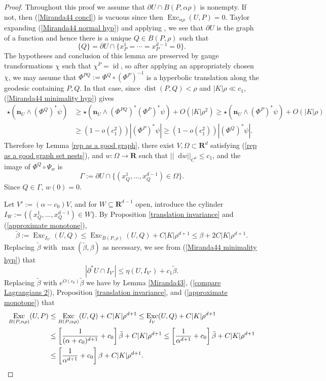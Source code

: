\documentclass[reqno,10pt]{amsart}
\newcommand{\RR}{\mathbf{R}}
\DeclareMathOperator{\Exc}{Exc}
\DeclareMathOperator{\id}{id}
\newcommand*\dif{\mathop{}\!\mathrm{d}}
\DeclareMathOperator{\dist}{dist}
\newcommand{\normal}{\mathbf n}
\theoremstyle{definition}
\numberwithin{equation}{section}
\begin{document}
\begin{proof}
Throughout this proof we assume that $\partial U \cap B(P, \alpha \rho)$ is nonempty.
If not, then (\ref{Miranda44 concl}) is vacuous since then $\Exc_{\alpha \rho} (U, P) = 0$.
Taylor expanding (\ref{Miranda44 normal hyp}) and applying \cite[Theorem 4.8]{Giusti77}, we see that $\partial U$ is the graph of a function and hence there is a unique $Q \in B(P, \rho)$ such that 
$$\{Q\} = \partial U \cap \{x_P^1 = \cdots = x_P^{d - 1} = 0\}.$$
The hypotheses and conclusion of this lemma are preserved by gauge transformations $\chi$ such that $\chi^P = \id$, so after applying an appropriately chosen $\chi$, we may assume that $\Phi^{PQ} := \Phi^Q \circ (\Phi^P)^{-1}$ is a hyperbolic translation along the geodesic containing $P, Q$. In that case, since $\dist(P, Q) < \rho$ and $|K| \rho \ll c_1$, (\ref{Miranda44 minimality hyp}) gives
\begin{align*}
\star(\normal_U \wedge (\Phi^Q)^* \psi) &\geq \star(\normal_U \wedge (\Phi^{PQ})^* (\Phi^P)^* \psi) + O(|K| \rho^2) \geq \star (\normal_U \wedge (\Phi^P)^* \psi) + O(|K| \rho) \\
&\geq (1 - o(c_1^2)) |(\Phi^P)^* \psi| \geq (1 - o(c_1^2)) |(\Phi^Q)^* \psi|.
\end{align*}
Therefore by Lemma \ref{rep as a good graph}, there exist $V, \Omega \subset \RR^d$ satisfying (\ref{rep as a good graph set nests}), and $w: \Omega \to \RR$ such that $||\dif w||_{C^0} \leq c_1$, and the image of $\Phi^Q \circ \Psi_w$ is
$$\Gamma := \partial U \cap \{(x_Q^1, \dots, x_Q^{d - 1}) \in \Omega\}.$$
Since $Q \in \Gamma$, $w(0) = 0$.

Let $V' := (\alpha - c_0) V$, and for $W \subseteq \RR^{d - 1}$ open, introduce the cylinder $I_W := \{(x^1_Q, \dots, x^{d - 1}_Q) \in W\}$.
By Proposition \ref{translation invariance} and (\ref{approximate monotone}),
$$\tilde \beta := \Exc_{I_{V'}} (U, Q) \leq \Exc_{B(P, \rho)} (U, Q) + C|K| \rho^{d + 1} \leq \beta + 2C|K| \rho^{d + 1}.$$
Replacing $\tilde \beta$ with $\max(\tilde \beta, \beta)$ as necessary, we see from (\ref{Miranda44 minimality hyp}) that
$$|\partial^* U \cap I_{V'}| \leq \eta(U, I_{V'}) + c_1 \tilde \beta.$$
Replacing $\tilde \beta$ with $e^{O(c_0)} \tilde \beta$ we have by Lemma \ref{Miranda43}, (\ref{compare Lagrangians 2}), Proposition \ref{translation invariance}, and (\ref{approximate monotone}) that 
\begin{align*}
\Exc_{B(P, \alpha \rho)} (U, P) &\leq \Exc_{B(P, \alpha \rho)} (U, Q) + C|K| \rho^{d + 1} \leq \Exc_{I_V} (U, Q) + C|K| \rho^{d + 1}\\
&\leq \left[\frac{1}{(\alpha + c_0)^{d + 1}} + c_0\right] \tilde \beta + C|K| \rho^{d + 1} \leq \left[\frac{1}{\alpha^{d + 1}} + c_0\right] \tilde \beta + C|K| \rho^{d + 1} \\
&\leq \left[\frac{1}{\alpha^{d + 1}} + c_0\right] \beta + C|K| \rho^{d + 1}. 
\qedhere 
\end{align*}
\end{proof}
\end{document}
